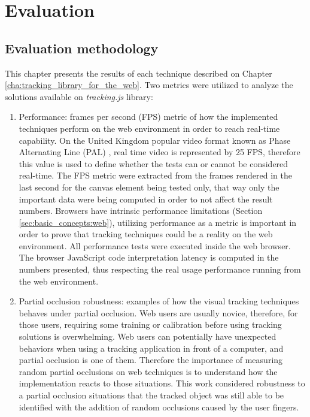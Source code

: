 \chapter{Evaluation} %
\label{cha:evaluation}

\section{Evaluation methodology} %
\label{sec:evaluation:evaluation_methodology}

This chapter presents the results of each technique described on Chapter \ref{cha:tracking_library_for_the_web}. Two metrics were utilized to analyze the solutions available on \textit{tracking.js} library:

\begin{enumerate}
	\item Performance: frames per second (FPS) metric of how the implemented techniques perform on the web environment in order to reach real-time capability. On the United Kingdom popular video format known as Phase Alternating Line (PAL) \cite{PAL1962}, real time video is represented by 25 FPS, therefore this value is used to define whether the tests can or cannot be considered real-time. The FPS metric were extracted from the frames rendered in the last second for the canvas element being tested only, that way only the important data were being computed in order to not affect the result numbers. Browsers have intrinsic performance limitations (Section \ref{sec:basic_concepts:web}), utilizing performance as a metric is important in order to prove that tracking techniques could be a reality on the web environment. All performance tests were executed inside the web browser. The browser JavaScript code interpretation latency is computed in the numbers presented, thus respecting the real usage performance running from the web environment.
	\item Partial occlusion robustness: examples of how the visual tracking techniques behaves under partial occlusion. Web users are usually novice, therefore, for those users, requiring some training or calibration before using tracking solutions is overwhelming. Web users can potentially have unexpected behaviors when using a tracking application in front of a computer, and partial occlusion is one of them. Therefore the importance of measuring random partial occlusions on web techniques is to understand how the implementation reacts to those situations. This work considered robustness to a partial occlusion situations that the tracked object was still able to be identified with the addition of random occlusions caused by the user fingers.
\end{enumerate}

